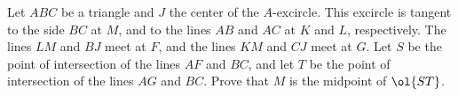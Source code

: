 Let $ABC$ be a triangle and $J$ the center of the $A$-excircle.
This excircle is tangent to the side $BC$ at $M$,
and to the lines $AB$ and $AC$ at $K$ and $L$, respectively.
The lines $LM$ and $BJ$ meet at $F$, and the lines $KM$ and $CJ$ meet at $G$.
Let $S$ be the point of intersection of the lines $AF$ and $BC$,
and let $T$ be the point of intersection of the lines $AG$ and $BC$.
Prove that $M$ is the midpoint of $\ol{ST}$.